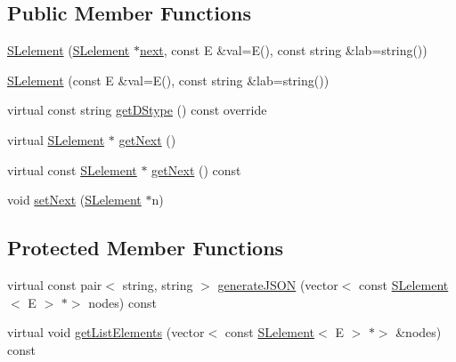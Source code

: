 \subsection*{Public Member Functions}
\begin{DoxyCompactItemize}
\item 
\hyperlink{classbridges_1_1datastructure_1_1_s_lelement_ac69e99f5b2b729a217160ee0517751aa}{S\+Lelement} (\hyperlink{classbridges_1_1datastructure_1_1_s_lelement}{S\+Lelement} $\ast$\hyperlink{classbridges_1_1datastructure_1_1_s_lelement_afc016a593a4a5aba82021ee34edadbfc}{next}, const E \&val=E(), const string \&lab=string())
\item 
\hyperlink{classbridges_1_1datastructure_1_1_s_lelement_a2f56e5f74a2cb43ab6ea718ae5bfdcbf}{S\+Lelement} (const E \&val=E(), const string \&lab=string())
\item 
virtual const string \hyperlink{classbridges_1_1datastructure_1_1_s_lelement_a602156aacacd73d1faa365d68d8af31b}{get\+D\+Stype} () const override
\item 
virtual \hyperlink{classbridges_1_1datastructure_1_1_s_lelement}{S\+Lelement} $\ast$ \hyperlink{classbridges_1_1datastructure_1_1_s_lelement_ae43dd771d9ced7cb17f1d35f34cd9a42}{get\+Next} ()
\item 
virtual const \hyperlink{classbridges_1_1datastructure_1_1_s_lelement}{S\+Lelement} $\ast$ \hyperlink{classbridges_1_1datastructure_1_1_s_lelement_a8c62cb82fa64bbfe9ebb7334a5fea417}{get\+Next} () const
\item 
void \hyperlink{classbridges_1_1datastructure_1_1_s_lelement_acf736223b4cd27b0771b262870d70b94}{set\+Next} (\hyperlink{classbridges_1_1datastructure_1_1_s_lelement}{S\+Lelement} $\ast$n)
\end{DoxyCompactItemize}
\subsection*{Protected Member Functions}
\begin{DoxyCompactItemize}
\item 
virtual const pair$<$ string, string $>$ \hyperlink{classbridges_1_1datastructure_1_1_s_lelement_a15d224314bbda510603042b504322410}{generate\+J\+S\+ON} (vector$<$ const \hyperlink{classbridges_1_1datastructure_1_1_s_lelement}{S\+Lelement}$<$ E $>$ $\ast$$>$ nodes) const
\item 
virtual void \hyperlink{classbridges_1_1datastructure_1_1_s_lelement_a81b68786cb93fe0f7edb48af789535a5}{get\+List\+Elements} (vector$<$ const \hyperlink{classbridges_1_1datastructure_1_1_s_lelement}{S\+Lelement}$<$ E $>$ $\ast$$>$ \&nodes) const
\end{DoxyCompactItemize}
